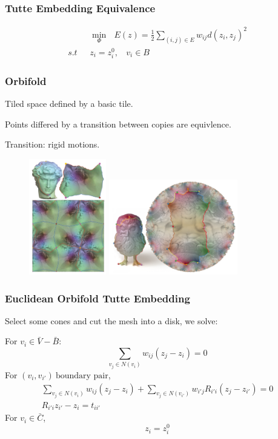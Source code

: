 \documentclass{beamer}
\begin{document}
\begin{frame}
\frametitle{Tutte Embedding Equivalence}
\begin{equation}
\begin{split}
&\min_{\Phi}\ \ \   E(z) = \frac{1}{2}\sum_{(i,j)\in E} w_{ij} d(z_i, z_j)^2 \\
s.t \ \ \   &z_i = z_i^0, \ \ \ \ v_i \in B
\end{split}
\nonumber
\end{equation}
\end{frame}

\begin{frame}
\frametitle{Orbifold}
Tiled space defined by a basic tile.

Points differed by a transition between copies are equivlence.

Transition: rigid motions.

\begin{figure}
\includegraphics[width=0.3\textwidth]{images/euclidean-orbifold.png}
\includegraphics[width=0.5\textwidth]{images/hyperbolic-orbifold.png}
\end{figure}
\end{frame}

\begin{frame}
\frametitle{Euclidean Orbifold Tutte Embedding}
Select some cones and cut the mesh into a disk, we solve:

For $v_i \in \bar{V}-\bar{B}$: $$ \sum_{v_j \in N(v_i)}w_{ij}(z_j - z_i) = 0 $$
For $(v_i, v_{i'})\ \text{boundary pair}$,
$$\begin{matrix}
\sum_{v_j \in N(v_i)}w_{ij}(z_j - z_i) + \sum_{v_j\in N(v_{i'})} w_{i'j}R_{i'i}(z_j - z_{i'})  = 0\\
R_{i'i}z_{i'} - z_i  = t_{ii'} 
\end{matrix} $$
For $v_i \in \bar{C}$,
$$z_i = z_i^0  $$
\end{frame}
\end{document}
